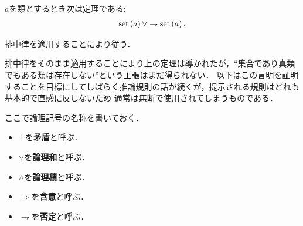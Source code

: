 	
	\begin{screen}
		\begin{thm}[類は集合であるか真類であるかのいずれかに定まる]
			$a$を類とするとき次は定理である:
			\begin{align}
				\operatorname*{set} \left(a\right) \vee \rightharpoondown \operatorname*{set} \left(a\right).
			\end{align}
		\end{thm}
	\end{screen}
	
	\begin{prf}
		排中律を適用することにより従う．
		\QED
	\end{prf}
	
	排中律をそのまま適用することにより上の定理は導かれたが，``集合であり真類でもある類は存在しない''という主張はまだ得られない．
	以下はこの言明を証明することを目標にしてしばらく推論規則の話が続くが，提示される規則はどれも基本的で直感に反しないため
	通常は無断で使用されてしまうものである．
	
	ここで論理記号の名称を書いておく．
	\begin{itemize}
		\item $\bot$を{\bf 矛盾}と呼ぶ．
		\item $\vee$を{\bf 論理和}と呼ぶ．
		\item $\wedge$を{\bf 論理積}と呼ぶ．
		\item $\Longrightarrow$を{\bf 含意}と呼ぶ．
		\item $\rightharpoondown$を{\bf 否定}と呼ぶ．
	\end{itemize}
	
